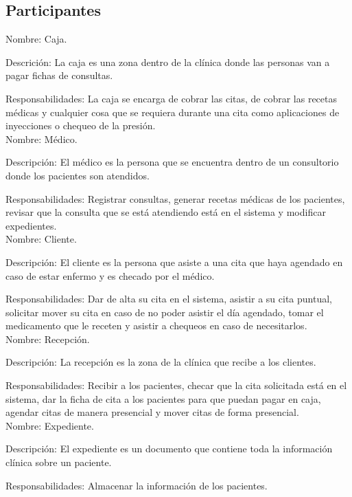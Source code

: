 \subsection{Participantes}

Nombre: Caja.

Descrición: La caja es una zona dentro de la clínica donde las personas van a pagar fichas de consultas.

Responsabilidades: La caja se encarga de cobrar las citas, de cobrar las recetas médicas y cualquier cosa que se requiera durante una cita como aplicaciones de inyecciones o chequeo de la presión. \\

Nombre: Médico.

Descripción: El médico es la persona que se encuentra dentro de un consultorio donde los pacientes son atendidos.

Responsabilidades: Registrar consultas, generar recetas médicas de los pacientes, revisar que la consulta que se está atendiendo está en el sistema y modificar expedientes. \\

Nombre: Cliente.

Descripción: El cliente es la persona que asiste a una cita que haya agendado en caso de estar enfermo y es checado por el médico.

Responsabilidades: Dar de alta su cita en el sistema, asistir a su cita puntual, solicitar mover su cita en caso de no poder asistir el día agendado, tomar el medicamento que le receten y asistir a chequeos en caso de necesitarlos. \\

Nombre: Recepción.

Descripción: La recepción es la zona de la clínica que recibe a los clientes.

Responsabilidades: Recibir a los pacientes, checar que la cita solicitada está en el sistema, dar la ficha de cita a los pacientes para que puedan pagar en caja, agendar citas de manera presencial y mover citas de forma presencial. \\

Nombre: Expediente.

Descripción: El expediente es un documento que contiene toda la información clínica sobre un paciente.

Responsabilidades: Almacenar la información de los pacientes. \\


